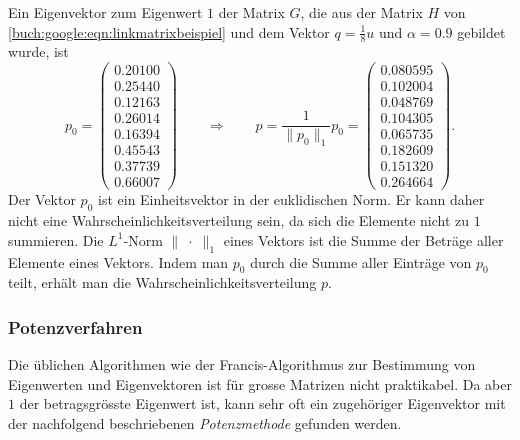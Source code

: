 \begin{beispiel}
Ein Eigenvektor zum Eigenwert $1$ der Matrix $G$, die aus der Matrix $H$
von \eqref{buch:google:eqn:linkmatrixbeispiel}
und dem Vektor $q=\frac18u$ und $\alpha=0.9$ gebildet wurde, ist
\[
p_0=\begin{pmatrix}
   0.20100\\
   0.25440\\
   0.12163\\
   0.26014\\
   0.16394\\
   0.45543\\
   0.37739\\
   0.66007
\end{pmatrix}
\qquad\Rightarrow\qquad
p
=
\frac{1}{\|p_0\|_1}p_0
=
\begin{pmatrix}
   0.080595\\
   0.102004\\
   0.048769\\
   0.104305\\
   0.065735\\
   0.182609\\
   0.151320\\
   0.264664
\end{pmatrix}.
\]
Der Vektor $p_0$ ist ein Einheitsvektor in der euklidischen Norm.
Er kann daher nicht eine Wahrscheinlichkeitsverteilung sein,
da sich die Elemente nicht zu $1$ summieren.
Die $L^1$-Norm $\|\;\cdot\;\|_1$ eines Vektors ist die Summe der Beträge aller
Elemente eines Vektors.
Indem man $p_0$ durch die Summe aller Einträge von $p_0$ teilt,
erhält man die Wahrscheinlichkeitsverteilung $p$.
\end{beispiel}


\subsubsection{Potenzverfahren}
Die üblichen Algorithmen wie der Francis-Algorithmus zur Bestimmung
von Eigenwerten und Eigenvektoren ist für grosse Matrizen nicht praktikabel.
Da aber $1$ der betragsgrösste Eigenwert ist, kann sehr oft ein zugehöriger
Eigenvektor mit der nachfolgend beschriebenen {\em Potenzmethode}
gefunden werden.

